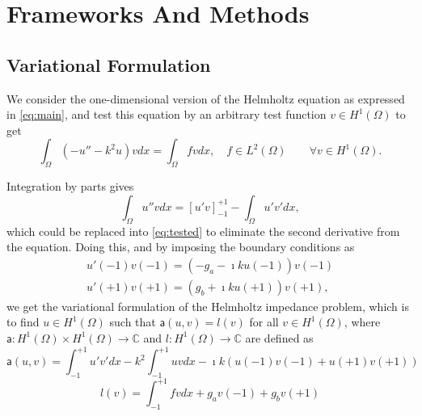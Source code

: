 \section{Frameworks And Methods}\label{sec:frameworks}

\subsection{Variational Formulation}
\label{sec:variational}

We consider the one-dimensional version of the Helmholtz equation as expressed in \eqref{eq:main}, and test this equation by an arbitrary test function $v \in H^{1}(\Omega)$ to get
\begin{equation}
    \label{eq:tested}
    \int_{\Omega}{{(-u'' - k^2u)}vdx} = \int_{\Omega}{fvdx}, \quad f \in L^2(\Omega) \qquad \forall v \in {H^{1}(\Omega)}.
\end{equation}

Integration by parts gives
\begin{equation}
    \int_{\Omega}{u''vdx} = [u'v]_{-1}^{+1} - \int_{\Omega}{u'v'dx},
\end{equation}
which could be replaced into \eqref{eq:tested} to eliminate the second derivative from the equation. Doing this, and by imposing the boundary conditions as
\begin{equation}
    \begin{aligned}
        u'(-1)v(-1) = (-g_a-\imath ku(-1))v(-1)\\
        u'(+1)v(+1) = (g_b+\imath ku(+1))v(+1),
    \end{aligned}
\end{equation}
we get the variational formulation of the Helmholtz impedance problem, which is to find $u \in {H^{1}(\Omega)}$ such that $\mathsf{a}(u,v) = l(v)$ for all $v \in {H^{1}(\Omega)}$, where $\mathsf{a}: H^{1}(\Omega) \times H^{1}(\Omega) \to \mathbb{C}$ and $l: H^{1}(\Omega) \to \mathbb{C}$ are defined as
\begin{equation}
    \label{eq:varlhs}
    \mathsf{a}(u, v) = \int_{-1}^{+1}{u'v'dx} - k^2 \int_{-1}^{+1}{uvdx} - \imath k (u(-1)v(-1) + u(+1)v(+1))
\end{equation}
\begin{equation}
    \label{eq:varrhs}
    l(v) = \int_{-1}^{+1}{fvdx} + g_a v(-1) + g_b v(+1)
\end{equation}


